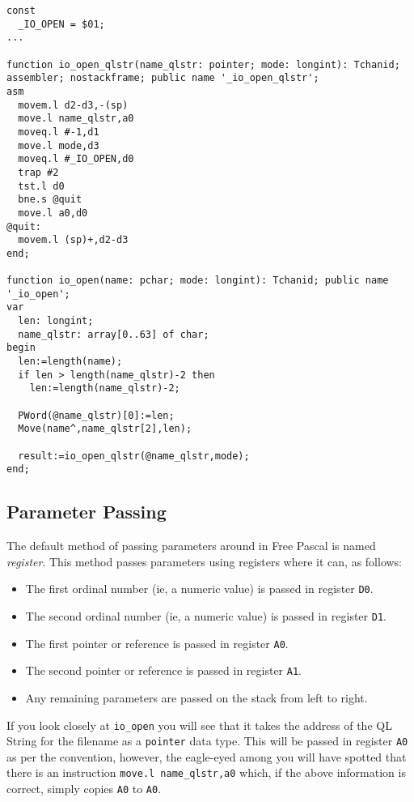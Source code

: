\begin{lstlisting}[caption={FPC Io\_open function},label={lis:FPC-Io_open-function}]
const
  _IO_OPEN = $01;
...

function io_open_qlstr(name_qlstr: pointer; mode: longint): Tchanid; assembler; nostackframe; public name '_io_open_qlstr';
asm
  movem.l d2-d3,-(sp)
  move.l name_qlstr,a0
  moveq.l #-1,d1
  move.l mode,d3
  moveq.l #_IO_OPEN,d0
  trap #2
  tst.l d0
  bne.s @quit
  move.l a0,d0
@quit:
  movem.l (sp)+,d2-d3
end;

function io_open(name: pchar; mode: longint): Tchanid; public name '_io_open';
var
  len: longint;
  name_qlstr: array[0..63] of char;
begin
  len:=length(name);
  if len > length(name_qlstr)-2 then
    len:=length(name_qlstr)-2;

  PWord(@name_qlstr)[0]:=len;
  Move(name^,name_qlstr[2],len);

  result:=io_open_qlstr(@name_qlstr,mode);
end;

\end{lstlisting}


\subsection{Parameter Passing}

The default method of passing parameters around in Free Pascal is
named \emph{register}. This method passes parameters using registers
where it can, as follows: 
\begin{itemize}
\item The first ordinal number (ie, a numeric value) is passed in register
\texttt{D0}.
\item The second ordinal number (ie, a numeric value) is passed in register
\texttt{D1}.
\item The first pointer or reference is passed in register \texttt{A0}.
\item The second pointer or reference is passed in register \texttt{A1}.
\item Any remaining parameters are passed on the stack from left to right.
\end{itemize}
If you look closely at \texttt{io\_open} you will see that it takes
the address of the QL String for the filename as a \texttt{pointer}
data type. This will be passed in register \texttt{A0} as per the
convention, however, the eagle-eyed among you will have spotted that
there is an instruction \lstinline[showstringspaces=false]!move.l name_qlstr,a0!
which, if the above information is correct, simply copies \texttt{A0}
to \texttt{A0}.

